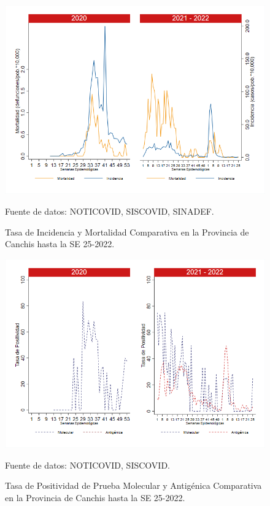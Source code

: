 \documentclass[12pt,a4paper,openany]{book}
\begin{document}
	\begin{figure}[h]
		\caption{Tasa de Incidencia y Mortalidad Comparativa en la Provincia de Canchis hasta la SE 25-2022.}\label{fig:inc_mort_canchis}
		\begin{center}
			\includegraphics[width=0.85\linewidth]{../figuras/incidencia_mortalidad_20_21_5.png}
		\end{center}
		{\footnotesize {Fuente de datos: NOTICOVID, SISCOVID, SINADEF.}}
	\end{figure}
	
	\begin{figure}[h]
		\caption{Tasa de Positividad de Prueba Molecular y Antigénica Comparativa en la Provincia de Canchis hasta la SE 25-2022.}\label{fig:positividad_canchis}
		\begin{center}
			\includegraphics[width=0.7\linewidth]{../figuras/positividad_20_21_5.png}
		\end{center}
		{\footnotesize {Fuente de datos: NOTICOVID, SISCOVID.}}
	\end{figure}
	
\end{document}
